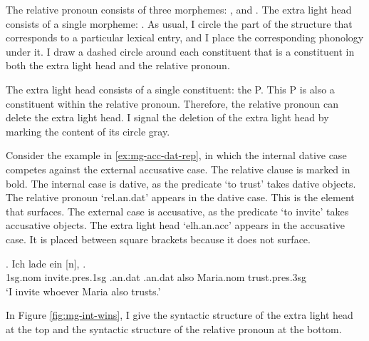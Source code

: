 The relative pronoun consists of three morphemes: ,  and .
The extra light head consists of a single morpheme: .
As usual, I circle the part of the structure that corresponds to a particular lexical entry, and I place the corresponding phonology under it.
I draw a dashed circle around each constituent that is a constituent in both the extra light head and the relative pronoun.

The extra light head consists of a single constituent: the P.
This P is also a constituent within the relative pronoun. Therefore, the relative pronoun can delete the extra light head. I signal the deletion of the extra light head by marking the content of its circle gray.

Consider the example in \ref{ex:mg-acc-dat-rep}, in which the internal dative case competes against the external accusative case. The relative clause is marked in bold.
The internal case is dative, as the predicate  `to trust' takes dative objects. The relative pronoun  `\ac{rel}.\ac{an}.\ac{dat}' appears in the dative case. This is the element that surfaces.
The external case is accusative, as the predicate  `to invite' takes accusative objects. The extra light head  `\ac{elh}.\ac{an}.\ac{acc}' appears in the accusative case. It is placed between square brackets because it does not surface.

\exg. Ich {lade ein} [n],    .\\
1\ac{sg}.\ac{nom} invite.\ac{pres}.1\ac{sg}\scsub{[acc]} .\ac{an}.\ac{dat} .\ac{an}.\ac{dat} also Maria.\ac{nom} trust.\ac{pres}.3\ac{sg}\scsub{[dat]}\\
`I invite whoever Maria also trusts.' \label{ex:mg-acc-dat-rep}

In Figure \ref{fig:mg-int-wins}, I give the syntactic structure of the extra light head at the top and the syntactic structure of the relative pronoun at the bottom.


